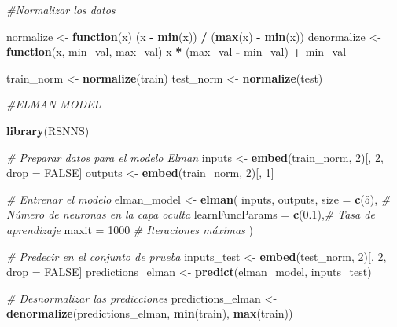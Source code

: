 \documentclass[
]{book}
\newenvironment{Shaded}{\begin{snugshade}}{\end{snugshade}}
\newcommand{\AttributeTok}[1]{\textcolor[rgb]{0.13,0.29,0.53}{#1}}
\newcommand{\CommentTok}[1]{\textcolor[rgb]{0.56,0.35,0.01}{\textit{#1}}}
\newcommand{\ConstantTok}[1]{\textcolor[rgb]{0.56,0.35,0.01}{#1}}
\newcommand{\ControlFlowTok}[1]{\textcolor[rgb]{0.13,0.29,0.53}{\textbf{#1}}}
\newcommand{\DecValTok}[1]{\textcolor[rgb]{0.00,0.00,0.81}{#1}}
\newcommand{\FloatTok}[1]{\textcolor[rgb]{0.00,0.00,0.81}{#1}}
\newcommand{\FunctionTok}[1]{\textcolor[rgb]{0.13,0.29,0.53}{\textbf{#1}}}
\newcommand{\NormalTok}[1]{#1}
\newcommand{\OtherTok}[1]{\textcolor[rgb]{0.56,0.35,0.01}{#1}}
\newcommand{\SpecialCharTok}[1]{\textcolor[rgb]{0.81,0.36,0.00}{\textbf{#1}}}
\begin{document}
\begin{Shaded}
\begin{Highlighting}[]
\CommentTok{\#Normalizar los datos }

\NormalTok{normalize }\OtherTok{\textless{}{-}} \ControlFlowTok{function}\NormalTok{(x) (x }\SpecialCharTok{{-}} \FunctionTok{min}\NormalTok{(x)) }\SpecialCharTok{/}\NormalTok{ (}\FunctionTok{max}\NormalTok{(x) }\SpecialCharTok{{-}} \FunctionTok{min}\NormalTok{(x))}
\NormalTok{denormalize }\OtherTok{\textless{}{-}} \ControlFlowTok{function}\NormalTok{(x, min\_val, max\_val) x }\SpecialCharTok{*}\NormalTok{ (max\_val }\SpecialCharTok{{-}}\NormalTok{ min\_val) }\SpecialCharTok{+}\NormalTok{ min\_val}

\NormalTok{train\_norm }\OtherTok{\textless{}{-}} \FunctionTok{normalize}\NormalTok{(train)}
\NormalTok{test\_norm }\OtherTok{\textless{}{-}} \FunctionTok{normalize}\NormalTok{(test)}


\CommentTok{\#ELMAN MODEL}

\FunctionTok{library}\NormalTok{(RSNNS)}

\CommentTok{\# Preparar datos para el modelo Elman}
\NormalTok{inputs }\OtherTok{\textless{}{-}} \FunctionTok{embed}\NormalTok{(train\_norm, }\DecValTok{2}\NormalTok{)[, }\DecValTok{2}\NormalTok{, drop }\OtherTok{=} \ConstantTok{FALSE}\NormalTok{]}
\NormalTok{outputs }\OtherTok{\textless{}{-}} \FunctionTok{embed}\NormalTok{(train\_norm, }\DecValTok{2}\NormalTok{)[, }\DecValTok{1}\NormalTok{]}

\CommentTok{\# Entrenar el modelo}
\NormalTok{elman\_model }\OtherTok{\textless{}{-}} \FunctionTok{elman}\NormalTok{(}
\NormalTok{  inputs,}
\NormalTok{  outputs,}
  \AttributeTok{size =} \FunctionTok{c}\NormalTok{(}\DecValTok{5}\NormalTok{),             }\CommentTok{\# Número de neuronas en la capa oculta}
  \AttributeTok{learnFuncParams =} \FunctionTok{c}\NormalTok{(}\FloatTok{0.1}\NormalTok{),}\CommentTok{\# Tasa de aprendizaje}
  \AttributeTok{maxit =} \DecValTok{1000}             \CommentTok{\# Iteraciones máximas}
\NormalTok{)}

\CommentTok{\# Predecir en el conjunto de prueba}
\NormalTok{inputs\_test }\OtherTok{\textless{}{-}} \FunctionTok{embed}\NormalTok{(test\_norm, }\DecValTok{2}\NormalTok{)[, }\DecValTok{2}\NormalTok{, drop }\OtherTok{=} \ConstantTok{FALSE}\NormalTok{]}
\NormalTok{predictions\_elman }\OtherTok{\textless{}{-}} \FunctionTok{predict}\NormalTok{(elman\_model, inputs\_test)}

\CommentTok{\# Desnormalizar las predicciones}
\NormalTok{predictions\_elman }\OtherTok{\textless{}{-}} \FunctionTok{denormalize}\NormalTok{(predictions\_elman, }\FunctionTok{min}\NormalTok{(train), }\FunctionTok{max}\NormalTok{(train))}


\end{Highlighting}
\end{Shaded}
\end{document}
